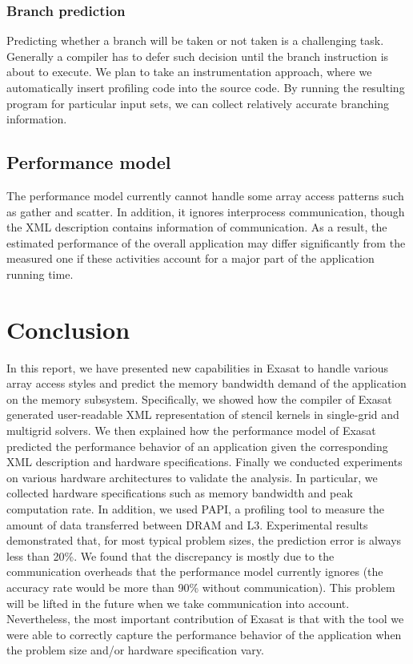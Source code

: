 \documentclass{article}
\begin{document}
\subsubsection{Branch prediction}
Predicting whether a branch will be taken or not taken is a challenging task.
Generally a compiler has to defer such decision until the branch instruction is about to execute.
We plan to take an instrumentation approach, where we automatically insert profiling code into the source code.
By running the resulting program for particular input sets, we can collect relatively accurate branching information.

\subsection{Performance model}
The performance model currently cannot handle some array access patterns such as gather and scatter.
In addition, it ignores interprocess communication, though the XML description contains information of communication.
As a result, the estimated performance of the overall application may differ significantly from the measured one if these activities account for a major part of the application running time.

\section{Conclusion}
In this report, we have presented new capabilities in Exasat to handle various array access styles and predict the memory bandwidth demand of the application on the memory subsystem.
Specifically, we showed how the compiler of Exasat generated user-readable XML representation of stencil kernels in single-grid and multigrid solvers.
We then explained how the performance model of Exasat predicted the performance behavior of an application given the corresponding XML description and hardware specifications.
Finally we conducted experiments on various hardware architectures to validate the analysis.
In particular, we collected hardware specifications such as memory bandwidth and peak computation rate.
In addition, we used PAPI, a profiling tool to measure the amount of data transferred between DRAM and L3.
Experimental results demonstrated that, for most typical problem sizes,  the prediction error is always less than 20\%.  %
We found that the discrepancy is mostly due to the communication overheads that the performance model currently ignores (the accuracy rate would be more than 90\% without communication).
This problem will be lifted in the future when we take communication into account. 
Nevertheless, the most important contribution of Exasat is that with the tool we were able to correctly capture the performance behavior of the application when the problem size and/or hardware specification vary.
\end{document}
